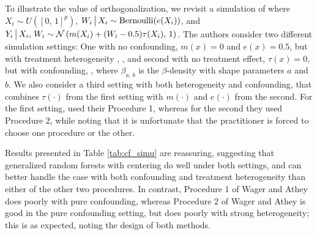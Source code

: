 \documentclass[aos]{imsart}
\theoremstyle{plain}
\theoremstyle{definition}
\theoremstyle{remark}
\begin{document}
\begin{CJK}{UTF8}{gbsn}
{To illustrate the value of orthogonalization, we revisit a simulation of
\citet{wager2015estimation} where $X_i \sim U([0, \, 1]^p)$,
$W_i \,\big|\, X_i \sim \text{Bernoulli}(e(X_i))$, and
$Y_i \,\big|\, X_i, \, W_i \sim \mathcal{N}\left(m(X_i) + (W_i - 0.5) \tau(X_i), \, 1\right)$. The authors
consider two different simulation settings: One with no confounding,
$m(x) = 0$ and $e(x) = 0.5$, but with treatment heterogeneity
, ,
and second with no treatment effect, $\tau(x) = 0$, but with confounding,
,
where $\beta_{a, \, b}$ is the $\beta$-density with shape parameters $a$ and $b$.
We also consider a third setting with both heterogeneity and confounding, that combines
$\tau(\cdot)$ from the first setting with $m(\cdot)$ and $e(\cdot)$ from the second.
For the first setting, \citet{wager2015estimation} used their Procedure 1, whereas for the
second they used Procedure 2, while noting that it is unfortunate that the practitioner
is forced to choose one procedure or the other.

Results presented in Table \ref{tab:cf_simu} are reassuring, suggesting that
generalized random forests with centering do well under both settings, and
can better handle the case with both confounding and treatment heterogeneity than
either of the other two procedures. In contrast, Procedure 1 of Wager and Athey
does poorly with pure confounding, whereas Procedure 2 of Wager and Athey
is good in the pure confounding setting, but does poorly with strong heterogeneity;
this is as expected, noting the design of both methods.


}
\end{CJK}
\end{document}
